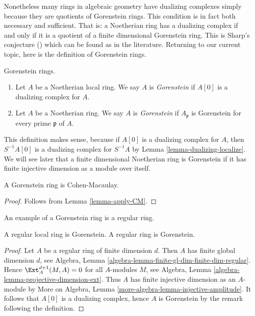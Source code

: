 \medskip\noindent
Nonetheless many rings in algebraic geometry have dualizing complexes
simply because they are quotients of Gorenstein rings. This condition
is in fact both necessary and sufficient. That is: a Noetherian ring
has a dualizing complex if and only if it is a quotient of a finite
dimensional Gorenstein ring. This is Sharp's conjecture (\cite{Sharp})
which can be found as \cite[Corollary 1.4]{Kawasaki} in the literature.
Returning to our current topic, here is the definition of Gorenstein rings.

\begin{definition}
\label{definition-gorenstein}
Gorenstein rings.
\begin{enumerate}
\item Let $A$ be a Noetherian local ring. We say $A$ is {\it Gorenstein}
if $A[0]$ is a dualizing complex for $A$.
\item Let $A$ be a Noetherian ring. We say $A$ is {\it Gorenstein}
if $A_\mathfrak p$ is Gorenstein for every prime $\mathfrak p$ of $A$.
\end{enumerate}
\end{definition}

\noindent
This definition makes sense, because if $A[0]$ is a dualizing complex
for $A$, then $S^{-1}A[0]$ is a dualizing complex for $S^{-1}A$ by
Lemma \ref{lemma-dualizing-localize}.
We will see later that a finite dimensional Noetherian ring is Gorenstein
if it has finite injective dimension as a module over itself.

\begin{lemma}
\label{lemma-gorenstein-CM}
A Gorenstein ring is Cohen-Macaulay.
\end{lemma}

\begin{proof}
Follows from Lemma \ref{lemma-apply-CM}.
\end{proof}

\noindent
An example of a Gorenstein ring is a regular ring.

\begin{lemma}
\label{lemma-regular-gorenstein}
A regular local ring is Gorenstein.
A regular ring is Gorenstein.
\end{lemma}

\begin{proof}
Let $A$ be a regular ring of finite dimension $d$. Then $A$ has finite
global dimension $d$, see
Algebra, Lemma \ref{algebra-lemma-finite-gl-dim-finite-dim-regular}.
Hence $\Ext^{d + 1}_A(M, A) = 0$ for all $A$-modules $M$, see
Algebra, Lemma \ref{algebra-lemma-projective-dimension-ext}.
Thus $A$ has finite injective dimension as an $A$-module by
More on Algebra, Lemma \ref{more-algebra-lemma-injective-amplitude}.
It follows that $A[0]$ is a dualizing complex, hence $A$ is
Gorenstein by the remark following the definition.
\end{proof}

